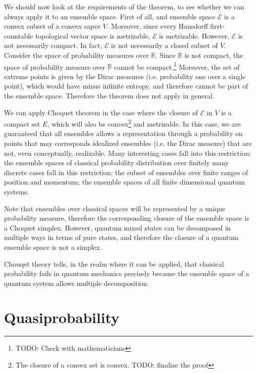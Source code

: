 \documentclass[10pt,twocolumn, nofootinbib]{revtex4-2}
\newcommand{\Ens}[1][E] {\mathcal{#1}} %
\begin{document}
We should now look at the requirements of the theorem, to see whether we can always apply it to an ensemble space. First of all, and ensemble space $\Ens$ is a convex subset of a convex sapce $V$. Moreover, since every Hausdorff first-countable topological vector space is metrizable, $\Ens$ is metrizable. However, $\Ens$ is not necessarily compact. In fact, $\Ens$ is not necessarily a closed subset of $V$. Consider the space of probability measures over $\mathbb{R}$. Since $\mathbb{R}$ is not compact, the space of probability measure over $\mathbb{R}$ cannot be compact.\footnote{TODO: Check with mathematicians} Moreover, the set of extreme points is given by the Dirac measures (i.e. probability one over a single point), which would have minus infinite entropy, and therefore cannot be part of the ensemble space. Therefore the theorem does not apply in general.

We can apply Choquet theorem in the case where the closure of $\Ens$ in $V$ is a compact set $E$, which will also be convex\footnote{The closure of a convex set is convex. TODO: finalize the proof} and metrizable. In this case, we are guaranteed that all ensembles allows a representation through a probability on points that may corresponds idealized ensembles (i.e. the Dirac measure) that are not, even conceptually, realizable. Many interesting cases fall into this restriction: the ensemble spaces of classical probability distribution over finitely many discrete cases fall in this restriction; the subset of ensembles over finite ranges of position and momentum; the ensemble spaces of all finite dimensional quantum systems.

Note that ensembles over classical spaces will be represented by a unique probability measure, therefore the corresponding closure of the ensemble space is a Choquet simplex. However, quantum mixed states can be decomposed in multiple ways in terms of pure states, and therefore the closure of a quantum ensemble space is not a simplex.


Chouqet theory tells, in the realm where it can be applied, that classical probability fails in quantum mechanics precisely because the ensemble space of a quantum system allows multiple decomposition.

\section{Quasiprobability}
\end{document}
